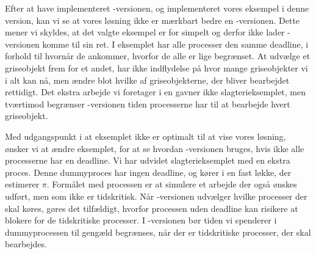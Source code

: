 


Efter at have implementeret -versionen, og implementeret vores eksempel i denne version, kan vi se at vores løsning ikke er mærkbart bedre en -versionen. Dette mener vi skyldes, at det valgte eksempel er for simpelt og derfor ikke lader -versionen komme til sin ret. I eksemplet har alle processer den samme deadline, i forhold til hvornår de ankommer, hvorfor de alle er lige begrænset. At udvælge et griseobjekt frem for et andet, har ikke indflydelse på  hvor mange griseobjekter vi i alt kan nå, men ændre blot hvilke af griseobjekterne, der bliver bearbejdet rettidigt. Det ekstra arbejde vi foretager i \sched en gavner ikke slagterieksemplet, men tværtimod begrænser -versionen tiden processerne har til at bearbejde hvert griseobjekt.

Med udgangspunkt i at eksemplet ikke er optimalt til at vise vores løsning, ønsker vi at ændre eksemplet, for at se hvordan -versionen bruges, hvis ikke alle processerne har en deadline. Vi har udvidet slagterieksemplet med en ekstra proces. Denne dummyproces har ingen deadline, og kører i en fast løkke, der estimerer $\pi$. Formålet med processen er at simulere et arbejde der også ønskes udført, men som ikke er tidskritisk. Når -versionen udvælger hvilke processer der skal køres, gøres det tilfældigt, hvorfor processen uden deadline kan risikere at blokere for de tidskritiske processer. I -versionen bør tiden vi spenderer i  dummyprocessen til gengæld begrænses, når der er tidskritiske processer, der skal bearbejdes.

